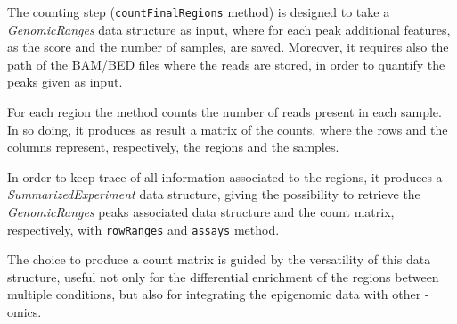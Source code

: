 The counting step (\lstinline{countFinalRegions} method) is designed to take a \textit{GenomicRanges} data structure as input, where for each peak additional features, as the score and the number of samples, are saved.
Moreover, it requires also the path of the BAM/BED files where the reads are stored, in order to quantify the peaks given as input.

For each region the method counts the number of reads present in each sample.
In so doing, it produces as result a matrix of the counts, where the rows and the columns represent, respectively, the regions and the samples.

In order to keep trace of all information associated to the regions, it produces a \textit{SummarizedExperiment} \cite{SummExp} data structure, giving the possibility to retrieve the \textit{GenomicRanges} peaks associated data structure and the count matrix, respectively, with \lstinline{rowRanges} and \lstinline{assays} method.

The choice to produce a count matrix is guided by the versatility of this data structure, useful not only for the differential enrichment of the regions between multiple conditions, but also for integrating the epigenomic data with other -omics.